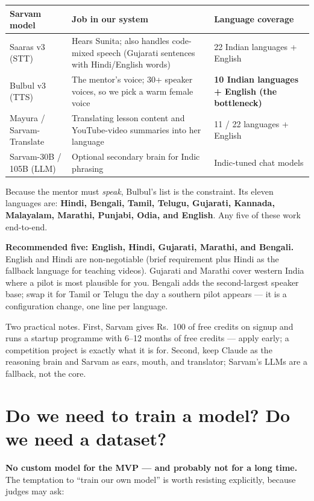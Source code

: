 \documentclass[11pt]{article}
\begin{document}
\begin{center}
\begin{tabular}{p{4.2cm} p{4.4cm} p{5.4cm}}
\toprule
\textbf{Sarvam model} & \textbf{Job in our system} & \textbf{Language coverage} \\
\midrule
Saaras v3 (STT) & Hears Sunita; also handles code-mixed speech (Gujarati sentences with Hindi/English words) & 22 Indian languages + English \\
Bulbul v3 (TTS) & The mentor's voice; 30+ speaker voices, so we pick a warm female voice & \textbf{10 Indian languages + English (the bottleneck)} \\
Mayura / Sarvam-Translate & Translating lesson content and YouTube-video summaries into her language & 11 / 22 languages + English \\
Sarvam-30B / 105B (LLM) & Optional secondary brain for Indic phrasing & Indic-tuned chat models \\
\bottomrule
\end{tabular}
\end{center}

Because the mentor must \emph{speak}, Bulbul's list is the constraint. Its eleven languages are: \textbf{Hindi, Bengali, Tamil, Telugu, Gujarati, Kannada, Malayalam, Marathi, Punjabi, Odia, and English}. Any five of these work end-to-end.

\textbf{Recommended five: English, Hindi, Gujarati, Marathi, and Bengali.} English and Hindi are non-negotiable (brief requirement plus Hindi as the fallback language for teaching videos). Gujarati and Marathi cover western India where a pilot is most plausible for you. Bengali adds the second-largest speaker base; swap it for Tamil or Telugu the day a southern pilot appears --- it is a configuration change, one line per language.

Two practical notes. First, Sarvam gives Rs.~100 of free credits on signup and runs a startup programme with 6--12 months of free credits --- apply early; a competition project is exactly what it is for. Second, keep Claude as the reasoning brain and Sarvam as ears, mouth, and translator; Sarvam's LLMs are a fallback, not the core.

\section{Do we need to train a model? Do we need a dataset?}

\textbf{No custom model for the MVP --- and probably not for a long time.} The temptation to ``train our own model'' is worth resisting explicitly, because judges may ask:
\end{document}
